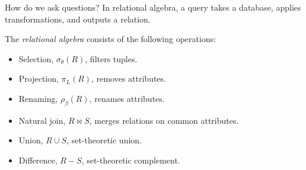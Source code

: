 \documentclass{beamer}
\begin{document}
\begin{frame}{How do we ask questions?}
  \pause
  \pause
  In relational algebra, a query takes a database, applies transformations, and outputs a relation.\pause

  \bigskip

  The \emph{relational algebra} consists of the following operations:
  \begin{itemize}
    \item Selection, $\sigma_\theta(R)$, filters tuples.
    \item Projection, $\pi_L(R)$, removes attributes.
    \item Renaming, $\rho_\beta(R)$, renames attributes.
    \item Natural join, $R \bowtie S$, merges relations on common attributes.
    \item Union, $R \cup S$, set-theoretic union.
    \item Difference, $R - S$, set-theoretic complement.
  \end{itemize}
\end{frame}
\end{document}
